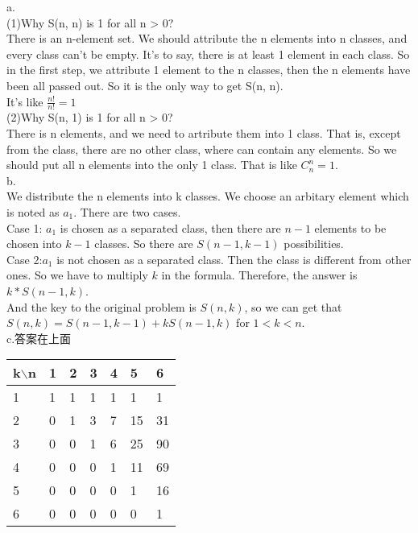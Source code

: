 \documentclass[a4paper, justified]{tufte-handout}
\begin{document}
\begin{solution}
  a.\\
  (1)Why S(n, n) is 1 for all n > 0?\\
  There is an n-element set. We should attribute the n elements into n classes, and every class can't be empty. It's to say, there is at least 1 element in each class. So in the first step, we attribute 1 element to the n classes, then the n elements have been all passed out. So it is the only way to get S(n, n).\\
  It's like $\frac{n!}{n!} = 1$\\
  (2)Why S(n, 1) is 1 for all n > 0?\\
  There is n elements, and we need to artribute them into 1 class. That is, except from the class, there are no other class, where can contain any elements. So we should put all n elements into the only 1 class. That is like $C_n^n = 1$.\\
  b.\\
  We distribute the n elements into k classes. We choose an arbitary element which is noted as $a_1$. There are two cases.\\
  Case 1: $a_1$ is chosen as a separated class, then there are $n-1$ elements to be chosen into $k-1$ classes. So there are $S(n − 1, k − 1)$ possibilities.\\
  Case 2:$a_1$ is not chosen as a separated class. Then the class is different from other ones. So we have to multiply $k$ in the formula. Therefore, the answer is $k * S(n - 1, k)$.\\
  And the key to the original problem is $S(n, k)$, so we can get that $S(n, k) = S(n − 1, k − 1) + kS(n − 1, k)$ for $1 <k<n$.\\
  c.答案在上面
  \begin{table}[]
    \begin{tabular}{|l|l|l|l|l|l|l|}
      \hline
      k$\backslash$n & 1 & 2 & 3 & 4 & 5  & 6  \\ \hline
      1              & 1 & 1 & 1 & 1 & 1  & 1  \\ \hline
      2              & 0 & 1 & 3 & 7 & 15 & 31 \\ \hline
      3              & 0 & 0 & 1 & 6 & 25 & 90 \\ \hline
      4              & 0 & 0 & 0 & 1 & 11 & 69 \\ \hline
      5              & 0 & 0 & 0 & 0 & 1  & 16 \\ \hline
      6              & 0 & 0 & 0 & 0 & 0  & 1  \\ \hline
    \end{tabular}
  \end{table}
\end{solution}
\end{document}
